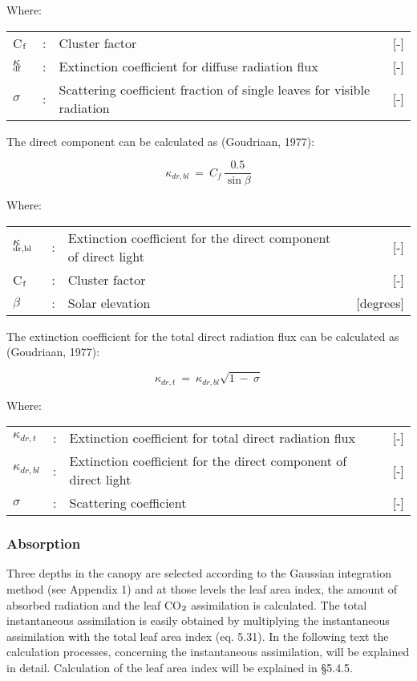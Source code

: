 Where:\\[5pt]
\begin{tabularx}{\textwidth}{llXr}
C$_{{\rm f}}$ &:& Cluster factor    &    [-]\\
$\kappa$$_{{\rm df}}$ &:& Extinction coefficient for diffuse radiation flux   &     [-]\\
$\sigma$ &:& Scattering coefficient fraction of single leaves for
   visible radiation  &      [-]\\
\end{tabularx}

The direct component can be calculated as (Goudriaan, 1977):

\begin{equation}
\kappa _{dr,bl} ~=~{ C _{f} }\,{\frac{0.5}{\sin \beta }}
\end{equation}

Where:\\[5pt]
\begin{tabularx}{\textwidth}{llXr}
$\kappa$$_{{\rm dr,bl}}$ &:& Extinction coefficient for the direct component of direct light   &     [-] \\
C$_{{\rm f}}$ &:& Cluster factor     &   [-]\\
$\beta$ &:& Solar elevation     &   [degrees]\\
\end{tabularx}

The extinction coefficient for the total direct radiation flux can be calculated as (Goudriaan, 1977):

\begin{equation}
\kappa _{dr,t} ~=~ \kappa _{dr,bl} \sqrt{1~-~\sigma }
\end{equation}

Where:\\[5pt]
\begin{tabularx}{\textwidth}{llXr}
$\kappa_{dr,t}$ &:& Extinction coefficient for total direct radiation flux   &    [-]\\
$\kappa_{dr,bl}$ &:& Extinction coefficient for the direct component of direct light  &   [-]\\
$\sigma$ &:& Scattering coefficient     &    [-]\\
\end{tabularx}

\subsubsection{Absorption}
Three depths in the canopy are selected according to the Gaussian integration method (see
Appendix 1) and at those levels the leaf area index, the amount of absorbed radiation and
the leaf CO$_{{\rm 2}}$ assimilation is calculated. The total instantaneous assimilation is easily
obtained by multiplying the instantaneous assimilation with the total leaf area index (eq.
5.31). In the following text the calculation processes, concerning the instantaneous
assimilation, will be explained in detail. Calculation of the leaf area index will be
explained in \S 5.4.5.

